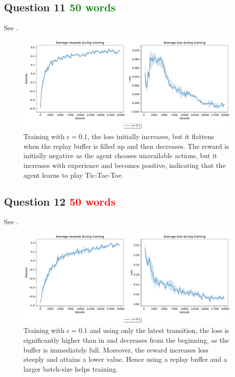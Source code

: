\documentclass[10pt]{IEEEtran}
\begin{document}
\subsection*{Question 11 \textcolor{green}{50 words}}
See .
\begin{figure}[h]
    \centering
    \includegraphics[width = \linewidth]{code/figures/rewards_epsilon_exploration_Q11.pdf}
    \caption{Training with $\epsilon = 0.1$, the loss initially increases, but it flattens when the replay buffer is filled up and then decreases. The reward is initially negative as the agent chooses unavailable actions, but it increases with experience and becomes positive, indicating that the agent learns to play Tic-Tac-Toe.}
    \label{plot_question11}
\end{figure}

\subsection*{Question 12 \textcolor{red}{50 words}}
See . 
\begin{figure}[h]
    \centering
    \includegraphics[width = \linewidth]{code/figures/rewards_epsilon_exploration_Q12.pdf}
    \caption{Training with $\epsilon = 0.1$ and  using only the latest transition, the loss is significantly higher than in  and decreases from the beginning, as the buffer is immediately full. Moreover, the reward increases less steeply and attains a lower value. Hence using a replay buffer and a larger batch-size helps training.}
    \label{plot_question12}
\end{figure}
\end{document}
